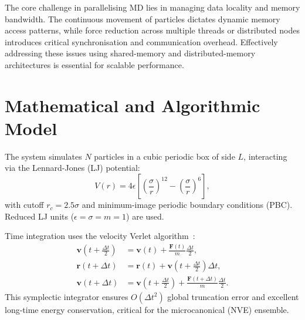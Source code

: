 \documentclass[conference]{IEEEtran}
\begin{document}
The core challenge in parallelising MD lies in managing data locality and memory bandwidth. The continuous movement of particles dictates dynamic memory access patterns, while force reduction across multiple threads or distributed nodes introduces critical synchronisation and communication overhead. Effectively addressing these issues using shared-memory and distributed-memory architectures is essential for scalable performance.

\section{Mathematical and Algorithmic Model}
The system simulates $N$ particles in a cubic periodic box of side $L$, interacting via the Lennard-Jones (LJ) potential:
\begin{equation}
  V(r) = 4\epsilon \!\left[ \!\left(\frac{\sigma}{r}\right)^{12} \!-\! \left(\frac{\sigma}{r}\right)^{6} \right],
  \label{eq:lj}
\end{equation}
with cutoff $r_c = 2.5\sigma$ and minimum-image periodic boundary conditions (PBC). Reduced LJ units ($\epsilon=\sigma=m=1$) are used.

Time integration uses the velocity Verlet algorithm~\cite{b7}:
\begin{align}
  \mathbf{v}(t + \tfrac{\Delta t}{2}) &= \mathbf{v}(t) + \tfrac{\mathbf{F}(t)}{m}\tfrac{\Delta t}{2}, \\
  \mathbf{r}(t + \Delta t)            &= \mathbf{r}(t) + \mathbf{v}(t + \tfrac{\Delta t}{2})\Delta t, \\
  \mathbf{v}(t + \Delta t)            &= \mathbf{v}(t+\tfrac{\Delta t}{2}) + \tfrac{\mathbf{F}(t+\Delta t)}{m}\tfrac{\Delta t}{2}.
\end{align}
This symplectic integrator ensures $O(\Delta t^2)$ global truncation error and excellent long-time energy conservation, critical for the microcanonical (NVE) ensemble.
\end{document}
